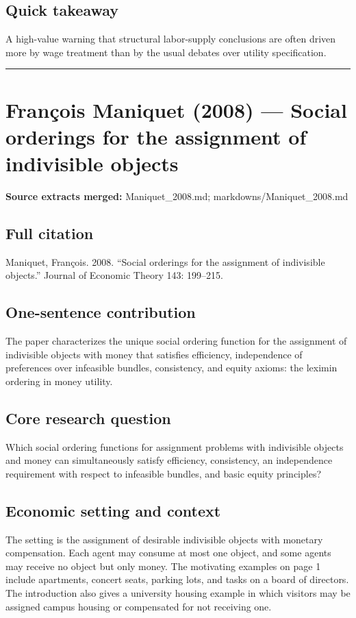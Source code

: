 \documentclass[11pt,a4paper]{article}
\begin{document}
\subsection*{Quick takeaway}
A high-value warning that structural labor-supply conclusions are often driven more by wage treatment than by the usual debates over utility specification.


\medskip\hrule\medskip

\section*{François Maniquet (2008) — Social orderings for the assignment of indivisible objects}

\textbf{Source extracts merged:} Maniquet\_2008.md; markdowns/Maniquet\_2008.md

\subsection*{Full citation}
Maniquet, François. 2008. “Social orderings for the assignment of indivisible objects.” Journal of Economic Theory 143: 199–215.

\subsection*{One-sentence contribution}
The paper characterizes the unique social ordering function for the assignment of indivisible objects with money that satisfies efficiency, independence of preferences over infeasible bundles, consistency, and equity axioms: the leximin ordering in money utility.

\subsection*{Core research question}
Which social ordering functions for assignment problems with indivisible objects and money can simultaneously satisfy efficiency, consistency, an independence requirement with respect to infeasible bundles, and basic equity principles?

\subsection*{Economic setting and context}
The setting is the assignment of desirable indivisible objects with monetary compensation. Each agent may consume at most one object, and some agents may receive no object but only money. The motivating examples on page 1 include apartments, concert seats, parking lots, and tasks on a board of directors. The introduction also gives a university housing example in which visitors may be assigned campus housing or compensated for not receiving one.
\end{document}
